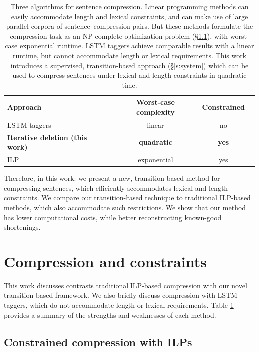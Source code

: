\documentclass[11pt,a4paper]{article}
\begin{document}
\begin{table}[htb!]
\begin{tabular}{lccc}
\textbf{Approach} & \textbf{Worst-case complexity} & \textbf{Constrained}  \\ \hline
LSTM taggers \cite{filippova2015sentence}   & linear              & no         \\   
\textbf{Iterative deletion (this work)}  & \textbf{quadratic}     &      \textbf{yes}   \\
ILP    \cite{filippova2013overcoming,Wang2017CanSH}       &   exponential    & yes      \\
\end{tabular}
\caption{Three algorithms for sentence compression. Linear programming methods \cite{clarke2008global,filippova2013overcoming,Wang2017CanSH} can easily accommodate length and lexical constraints, and can make use of large parallel corpora of sentence--compression pairs. But these methods formulate the compression task as an NP-complete optimization problem (\S\ref{s:ilps}), with worst-case exponential runtime. LSTM taggers \cite{filippova2015sentence} achieve comparable results with a linear runtime, but cannot accommodate length or lexical requirements. This work introduces a supervised, transition-based approach (\S\ref{s:system}) which can be used to compress sentences under lexical and length constraints in quadratic time.} 
\label{t:algos}
\end{table}


Therefore, in this work: we present a new, transition-based method for compressing sentences, which efficiently accommodates lexical and length constraints.  We compare our transition-based technique to traditional ILP-based methods, which also accommodate such restrictions. We show that our method has lower computational costs, while better reconstructing known-good shortenings. 

\section{Compression and constraints}

This work discusses contrasts traditional ILP-based compression with our novel transition-based framework. We also briefly discuss compression with LSTM taggers, which do not accommodate length or lexical requirements. Table \ref{t:algos} provides a summary of the strengths and weaknesses of each method.

\subsection{Constrained compression with ILPs}\label{s:ilps}
\end{document}
